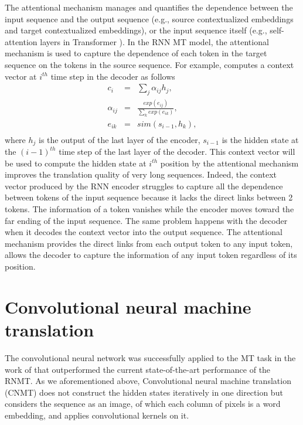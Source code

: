 The attentional mechanism manages and quantifies the dependence between the input sequence and the output sequence (e.g., source contextualized embeddings and target contextualized embeddings), or the input sequence itself (e.g., self-attention layers in Transformer \citep{Vaswani17attention}). In the RNN MT model, the attentional mechanism is used to capture the dependence of each token in the target sequence on the tokens in the source sequence. For example, \cite{Bahdanau15learning} computes a context vector at $i^{th}$ time step in the decoder as follows
\begin{equation}
\begin{array}{rcl}
c_i &=& \sum_{j} \alpha_{ij} h_j, \\
\alpha_{ij} &=& \frac{exp(e_{ij})}{\sum_{k}exp(e_{ik})}, \\
e_{ik} &=& sim(s_{i-1},h_k),\\
\end{array}
\end{equation}
where $h_j$ is the output of the last layer of the encoder, $s_{i-1}$ is the hidden state at the $(i-1)^{th}$ time step of the last layer of the decoder. This context vector will be used to compute the hidden state at $i^{th}$ position by the attentional mechanism improves the translation quality of very long sequences. Indeed, the context vector produced by the RNN encoder struggles to capture all the dependence between tokens of the input sequence because it lacks the direct links between 2 tokens. The information of a token vanishes while the encoder moves toward the far ending of the input sequence. The same problem happens with the decoder when it decodes the context vector into the output sequence. The attentional mechanism provides the direct links from each output token to any input token, allows the decoder to capture the information of any input token regardless of its position.

\section{Convolutional neural machine translation} \label{sec:cnn}
The convolutional neural network was successfully applied to the MT task in the work of \citet{Ghering17convolutional} that outperformed the current state-of-the-art performance of the RNMT. As we aforementioned above, Convolutional neural machine translation (CNMT) does not construct the hidden states iteratively in one direction but considers the sequence as an image, of which each column of pixels is a word embedding, and applies convolutional kernels on it.
